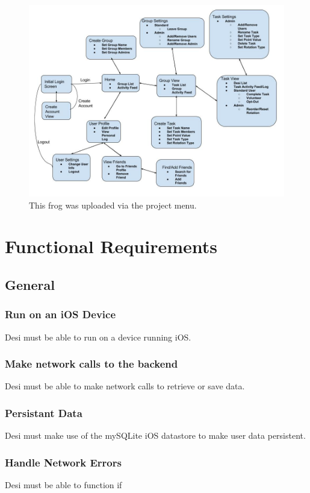 \documentclass[11pt, a4paper]{report}
\begin{document}
\begin{figure}[H]
\centering
\includegraphics[width=1.0\textwidth]{umlHighLevel.jpg}
\caption{\label{fig:frog}This frog was uploaded via the project menu.}
\end{figure}

\section{Functional Requirements}
\subsection{General}
\subsubsection{Run on an iOS Device}
Desi must be able to run on a device running iOS.
\subsubsection{Make network calls to the backend}
Desi must be able to make network calls to retrieve or save data.
\subsubsection{Persistant Data}
Desi must make use of the mySQLite iOS datastore to make user data persistent.
\subsubsection{Handle Network Errors}
Desi must be able to function if 
\end{document}
